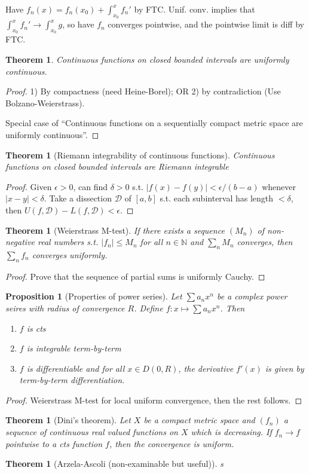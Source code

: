 \documentclass{article}
\theoremstyle{definition}
\theoremstyle{remark}
\theoremstyle{plain}
\newtheorem{thm}[defn]{Theorem}
\newtheorem{prop}[defn]{Proposition}
\theoremstyle{definition}
\newcommand{\NN}{\mathbb{N}}
\newcommand{\calD}{\mathcal{D}}
\begin{document}
    Have $f_n(x)=f_n(x_0)+\int_{x_0}^x f_n'$ by FTC. Unif. conv. implies that $\int_{x_0}^x f_n'\to \int_{x_0}^x g$, so have $f_n$ converges pointwise, and the pointwise limit is diff by FTC.
\begin{thm}
    Continuous functions on closed bounded intervals are uniformly continuous.
\end{thm}
\begin{proof}
    1) By compactness (need Heine-Borel); OR 2) by contradiction (Use Bolzano-Weierstrass).

    Special case of ``Continuous functions on a sequentially compact metric space are uniformly continuous''.
\end{proof}
\begin{thm}[Riemann integrability of continuous functions]
    Continuous functions on closed bounded intervals are Riemann integrable
\end{thm}
\begin{proof}
    Given $\epsilon>0$, can find $\delta>0$ s.t. $|f(x)-f(y)|<\epsilon/(b-a)$ whenever $|x-y|<\delta$. Take a dissection $\calD$ of $[a,b]$ s.t. each subinterval has length $<\delta$, then $U(f,\calD)-L(f,\calD)<\epsilon$.
\end{proof}
\begin{thm}[Weierstrass M-test]
    If there exists a sequence $(M_n)$ of non-negative real numbers s.t. $|f_n|\le M_n$ for all $n\in\NN$ and $\sum_n M_n$ converges, then $\sum_n f_n$ converges uniformly.
\end{thm}
\begin{proof}
    Prove that the sequence of partial sums is uniformly Cauchy.
\end{proof}
\begin{prop}[Properties of power series]
    Let $\sum a_nx^n$ be a complex power seires with radius of convergence $R$. Define $f:x\mapsto \sum a_nx^n$. Then
    \begin{enumerate}
        \item $f$ is cts
        \item $f$ is integrable term-by-term
        \item $f$ is differentiable and for all $x\in D(0,R)$, the derivative $f'(x)$ is given by term-by-term differentiation.
    \end{enumerate}
\end{prop}
\begin{proof}
    Weierstrass M-test for local uniform convergence, then the rest follows.
\end{proof}
\begin{thm}[Dini's theorem]
    Let $X$ be a compact metric space and $(f_n)$ a sequence of continuous real valued functions on $X$ which is decreasing. If $f_n\to f$ pointwise to a cts function $f$, then the convergence is uniform.
\end{thm}
\begin{thm}[Arzela-Ascoli (non-examinable but useful)]
    s
\end{thm}
\end{document}
